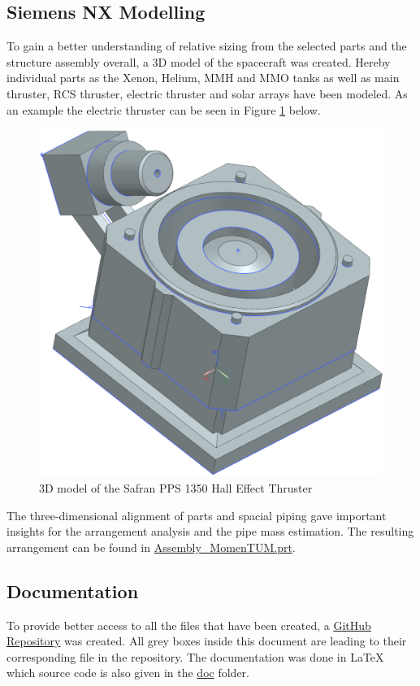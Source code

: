 \subsection{Siemens NX Modelling}

To gain a better understanding of relative sizing from the selected parts and the structure assembly overall, a 3D model of the spacecraft was created. Hereby individual parts as the Xenon, Helium, MMH and MMO tanks as well as main thruster, RCS thruster, electric thruster and solar arrays have been modeled. As an example the electric thruster can be seen in Figure \ref{fig:nx-pps} below.

\begin{figure}[H]
  \centering
  \includegraphics[width=0.7\linewidth]{img/nx_pps.png}
  \caption{3D model of the Safran PPS 1350 Hall Effect Thruster}
  \label{fig:nx-pps}
\end{figure}

The three-dimensional alignment of parts and spacial piping gave important insights for the arrangement analysis and the pipe mass estimation. The resulting arrangement can be found in \href{https://github.com/Sven-J-Steinert/MomenTUM/blob/main/NX/Assembly_MomenTUM.prt}{\colorbox{codegray}{Assembly\_MomenTUM.prt}}.
\\

\subsection{Documentation}
To provide better access to all the files that have been created, a \href{https://github.com/Sven-J-Steinert/MomenTUM}{\colorbox{codegray}{GitHub Repository}} was created.
All grey boxes inside this document are leading to their corresponding file in the repository.
The documentation was done in LaTeX which source code is also given in the \href{https://github.com/Sven-J-Steinert/MomenTUM/tree/main/doc}{\colorbox{codegray}{doc}} folder.